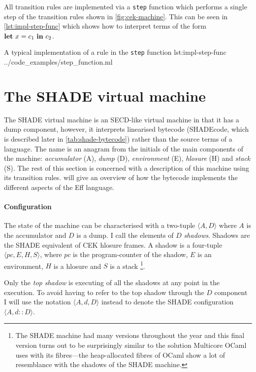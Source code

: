 \documentclass[class=article, crop=false]{standalone}
\begin{document}
All transition rules are implemented via a \lstinline{step} function which
performs a single step of the transition rules shown in
\autoref{fig:cek-machine}. This can be seen in \autoref{lst:impl-step-func}
which shows how to interpret terms of the form $\mathbf{let}\  x = c_1 \ \mathbf{in}\  c_2$.

{A typical implementation of a rule in the \lstinline{step} function}
{lst:impl-step-func}
{../code_examples/step_function.ml}

\section{The SHADE virtual machine}
\label{sec:shade-machine}

The SHADE virtual machine is an SECD-like virtual machine in that it has a dump
component, however, it interprets linearised bytecode (SHADEcode, which is described later in
\autoref{tab:shade-bytecode}) rather than the source terms of a language. The
name is an anagram from the initials of the main components of the machine: 
\emph{accumulator} (A), \emph{dump} (D), \emph{environment} (E),
\emph{hlosure} (H) and \emph{stack} (S). The rest of this section is concerned
with a description of this machine using its transition rules.
 will give an overview of how the bytecode
implements the different aspects of the Eff language.

\paragraph{Configuration}
The state of the machine can be characterised with a two-tuple
$\langle A, D \rangle$ where $A$ is the accumulator and $D$ is a dump. I call
the elements of $D$ \emph{shadows}. Shadows are the SHADE equivalent of CEK
hlosure frames. A shadow is a four-tuple $\langle pc, E, H, S \rangle$, where
$pc$ is the program-counter of the shadow, $E$ is an environment, $H$ is a
hlosure and $S$ is a stack
\footnote{The SHADE machine had many versions throughout the year and this
final version turns out to be surprisingly similar to the solution Multicore
OCaml uses with its fibres---the heap-allocated fibres of OCaml show a lot
of resemblance with the shadows of the SHADE machine.}.

Only the \emph{top shadow} is executing of all the shadows at any point in the
execution. To avoid having to refer to the top shadow through the $D$ component
I will use the notation $\langle A, d, D \rangle$ instead to denote the SHADE
configuration $\langle A, d :: D \rangle$.
\end{document}
